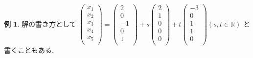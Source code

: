 \documentclass[dvipdfmx,a4paper,11pt]{article}
\newcommand{\R}{\mathbb{R}}
\theoremstyle{definition}
\newtheorem{exa}[thm]{例}
\begin{document}
\begin{exa}
解の書き方として
$
\begin{pmatrix}
x_1\\
x_2 \\
x_3 \\
x_4 \\
x_5 \\
\end{pmatrix}
=
\begin{pmatrix}
2\\
0 \\
-1 \\
0\\
1 \\
\end{pmatrix}
+ s
\begin{pmatrix}
2\\
1\\
0\\
0\\
0 \\
\end{pmatrix}
+ t
\begin{pmatrix}
-3\\
0\\
1\\
1\\
0 \\
\end{pmatrix}
(s, t \in \R)
$
と書くこともある.

 \end{exa}
 
 
 
\end{document}
